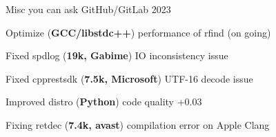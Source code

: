 \begin{multicols}{2}
\cventry
{Misc you can ask}
{}
{GitHub/GitLab}
{2023}
{
    \begin{cvitem}
        \item {Optimize (\textbf{GCC/libstdc++}) performance of rfind (on going)}
        \item {Fixed spdlog (\textbf{19k, Gabime}) IO inconsistency issue}
        \item {Fixed cpprestsdk (\textbf{7.5k, Microsoft}) UTF-16 decode issue}
        \item {Improved distro (\textbf{Python}) code quality +0.03}
        \item {Fixing retdec (\textbf{7.4k, avast}) compilation error on Apple Clang}
    \end{cvitem}
}

\def\customTextWidth{\textwidth}
\end{multicols}